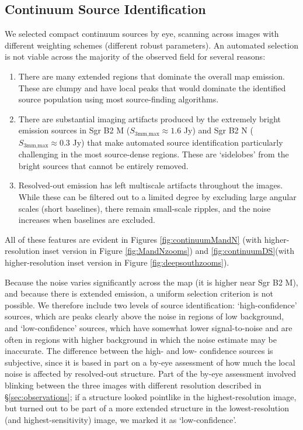 \documentclass[twocolumn]{aastex61}
\begin{document}
\subsection{Continuum Source Identification}
\label{sec:contsources}
We selected compact continuum  sources by eye,
scanning across images with different weighting schemes (different robust
parameters).  An automated selection is not viable across the majority of the
observed field for several reasons:
\begin{enumerate}
    \item There are many extended \hii regions that dominate the overall map
        emission.  These are clumpy and have local peaks that would dominate
        the identified source population using most source-finding algorithms.
    \item There are substantial imaging artifacts produced by the extremely
        bright emission sources in Sgr B2 M ($S_{3 \textrm{mm,max}} \approx 1.6$ Jy) and
        Sgr B2 N ($S_{3 \textrm{mm,max}} \approx 0.3$ Jy) that make automated source
        identification particularly challenging in the most source-dense
        regions.  These are `sidelobes' from the bright sources that cannot be
        entirely removed.
    \item Resolved-out emission has left multiscale artifacts throughout the
        images.  While these can be filtered out to a limited degree by
        excluding large angular scales (short baselines), there remain
        small-scale ripples, and the noise increases when baselines are
        excluded.
\end{enumerate}
All of these features are evident in Figures \ref{fig:continuumMandN} (with higher-resolution inset version in Figure \ref{fig:MandNzooms}) and
\ref{fig:continuumDS}(with higher-resolution inset version in Figure \ref{fig:deepsouthzooms}). 

Because the noise varies significantly across the map (it is higher near Sgr B2
M), and because there is extended emission, a uniform selection criterion is
not possible.  We therefore include two levels of source identification:
`high-confidence' sources, which are peaks clearly above the noise in regions
of low background, and `low-confidence' sources, which have somewhat lower
signal-to-noise and are often in regions with higher background in which the
noise estimate may be inaccurate.  The difference between the high- and low-
confidence sources is subjective, since it is based in part on a by-eye
assessment of how much the local noise is affected by resolved-out structure.
Part of the by-eye assessment involved blinking between the three images with
different resolution described in \S \ref{sec:observations}; if a structure
looked pointlike in the highest-resolution image, but turned out to be part of
a more extended structure in the lowest-resolution (and highest-sensitivity)
image, we marked it as `low-confidence'.
\end{document}
